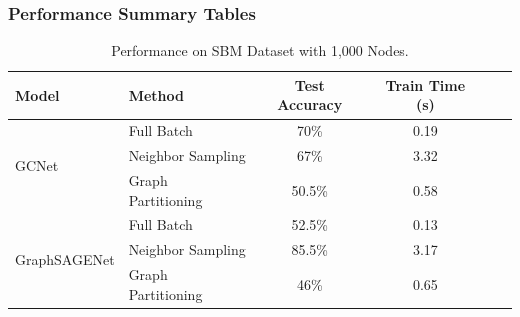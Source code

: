 \documentclass{article}
\begin{document}

\subsubsection{Performance Summary Tables}

\begin{table}[H]
    \centering
    \caption{Performance on SBM Dataset with 1,000 Nodes.}
    \label{tab:sbm_1000}
    \begin{tabular}{|l|l|c|c|c|c|}
        \hline
        \textbf{Model} & \textbf{Method} & \textbf{Test Accuracy} & \textbf{Train Time (s)} \\ \hline
        \multirow{3}{*}{GCNet} & Full Batch & 70\% & 0.19 \\ \cline{2-4}
                              & Neighbor Sampling & 67\% & 3.32 \\ \cline{2-4}
                              & Graph Partitioning & 50.5\% & 0.58 \\ \hline
        \multirow{3}{*}{GraphSAGENet} & Full Batch & 52.5\% & 0.13 \\ \cline{2-4}
                                      & Neighbor Sampling & 85.5\% & 3.17 \\ \cline{2-4}
                                      & Graph Partitioning & 46\% & 0.65 \\ \hline
    \end{tabular}
\end{table}
\end{document}
